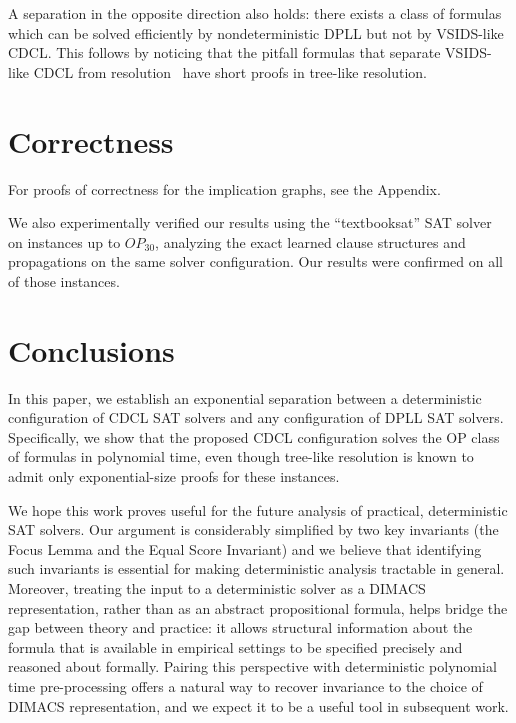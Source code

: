 \documentclass[a4paper,UKenglish,cleveref, autoref, thm-restate]{lipics-v2021}
\begin{document}
\begin{remark}
A separation in the opposite direction also holds: there exists a class of formulas which can be solved efficiently by nondeterministic DPLL but not by VSIDS-like CDCL. This follows by noticing that the pitfall formulas that separate VSIDS-like CDCL from resolution~\cite{pitfall} have short proofs in tree-like resolution.
\end{remark}

\section{Correctness}

For proofs of correctness for the implication graphs, see the Appendix.

We also experimentally verified our results using the ``textbooksat'' SAT solver ~\cite{vinyals_textbooksat} on instances up to $OP_{30}$, analyzing the exact learned clause structures and propagations on the same solver configuration. Our results were confirmed on all of those instances.

\section{Conclusions}
In this paper, we establish an exponential separation between a deterministic configuration of CDCL SAT solvers and any configuration of DPLL SAT solvers. Specifically, we show that the proposed CDCL configuration solves the OP class of formulas in polynomial time, even though tree-like resolution is known to admit only exponential-size proofs for these instances.

We hope this work proves useful for the future analysis of practical, deterministic SAT solvers. Our argument is considerably simplified by two key invariants (the Focus Lemma and the Equal Score Invariant) and we believe that identifying such invariants is essential for making deterministic analysis tractable in general. Moreover, treating the input to a deterministic solver as a DIMACS representation, rather than as an abstract propositional formula, helps bridge the gap between theory and practice: it allows structural information about the formula that is available in empirical settings to be specified precisely and reasoned about formally. Pairing this perspective with deterministic polynomial time pre-processing offers a natural way to recover invariance to the choice of DIMACS representation, and we expect it to be a useful tool in subsequent work.
\end{document}
